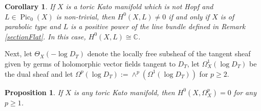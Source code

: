 \documentclass[JEP,XML,SOM,Unicode,NoFloatCountersInSection]{cedram}
\newtheorem{proposition}[theorem]{Proposition}
\newtheorem{corollary}[theorem]{Corollary}
\theoremstyle{definition}
\newcommand{\CC}{\mathbb{C}}
\DeclareMathOperator{\Pic}{Pic}
\begin{document}
\begin{corollary}
If $X$ is a toric Kato manifold which is not Hopf and $L\in\Pic_0(X)$ is non-trivial, then $H^0(X, L)\neq 0$ if and only if $X$ is of parabolic type and $L$ is a positive power of the line bundle defined in Remark \ref{sectionFlat}. In this case, $H^0(X, L)\cong\CC$.
\end{corollary}

Next, let $\Theta_X(-\log D_T)$ denote the locally free subsheaf of the tangent sheaf given by germs of holomorphic vector fields tangent to $D_T$, let $\Omega^1_X(\log D_T)$ be the dual sheaf and let $\Omega^p(\log D_T):=\wedge^p(\Omega^1(\log D_T))$ for $p\geq 2$.

\begin{proposition}\label{holF}
If $X$ is any toric Kato manifold, then $H^0(X,\Omega_X^p)=0$ for any $p\geq 1$.
\end{proposition}
\end{document}
